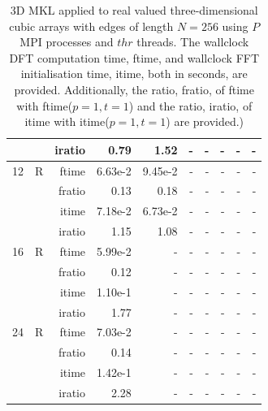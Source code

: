 \documentclass[a4paper]{article}
\begin{document}
\begin{table}[htbp]
\begin{center}
\begin{small}
\begin{tabular}{|r|r|r|r|r|r|r|r|r|r|}
             &             &  iratio &    0.79 &    1.52  &      - &      - &      - &      - &      - \\\hline
   12 &   R &   ftime &    6.63e-2 &    9.45e-2 &      - &      - &      - &      - &      - \\
             &             &  fratio &    0.13 &    0.18 &      - &      - &      - &      - &      - \\
             &             &  itime &    7.18e-2 &    6.73e-2 &      - &      - &      - &      - &      - \\
             &             &  iratio &    1.15  &    1.08  &      - &      - &      - &      - &      - \\\hline
   16 &   R &   ftime &    5.99e-2 &      - &      - &      - &      - &      - &      - \\
             &             &  fratio &   0.12 &      - &      - &      - &      - &      - &      - \\
             &             &  itime &    1.10e-1 &      - &      - &      - &      - &      - &      - \\
             &             &  iratio &   1.77  &      - &      - &      - &      - &      - &      - \\\hline
   24 &   R &   ftime &    7.03e-2 &      - &      - &      - &      - &      - &      - \\
             &             &  fratio &    0.14 &      - &      - &      - &      - &      - &      - \\
             &             &  itime &    1.42e-1 &      - &      - &      - &      - &      - &      - \\
             &             &  iratio &    2.28  &      - &      - &      - &      - &      - &      - \\\hline

\end{tabular}
\caption{3D MKL applied to real valued three-dimensional cubic arrays with edges of length $N=256$ using $P$ MPI processes and $thr$ threads. The wallclock DFT computation time, ftime, and wallclock FFT initialisation time, itime, both in seconds, are provided. Additionally, the ratio, fratio, of ftime  with ftime($p=1,t=1$) and the ratio, iratio, of itime  with itime($p=1,t=1$) are provided.) }\label{Tbl:MKL3d256}
\end{small}
\end{center}
\end{table}
\end{document}
